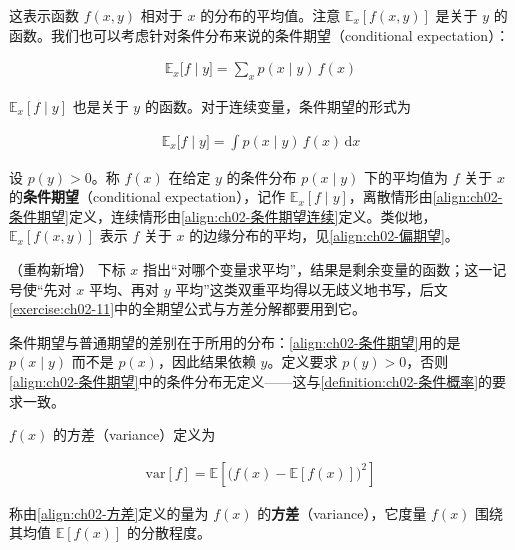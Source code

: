 \documentclass[../../main.tex]{subfiles}
\begin{document}
这表示函数 $f(x,y)$ 相对于 $x$ 的分布的平均值。注意 $\mathbb{E}_{x}[f(x,y)]$ 是关于 $y$ 的函数。我们也可以考虑针对条件分布来说的条件期望（conditional expectation）：

\begin{align}
  \mathbb{E}_{x}\big[f\mid y\big] = \sum_{x} p(x\mid y)\,f(x)
  \label{align:ch02-条件期望}
\end{align}

$\mathbb{E}_{x}[f\mid y]$ 也是关于 $y$ 的函数。对于连续变量，条件期望的形式为

\begin{align}
  \mathbb{E}_{x}\big[f\mid y\big] = \int p(x\mid y)\,f(x)\,\mathrm{d}x
  \label{align:ch02-条件期望连续}
\end{align}

\begin{definition}[条件期望]\label{definition:ch02-条件期望}
设 $p(y)>0$。称 $f(x)$ 在给定 $y$ 的条件分布 $p(x\mid y)$ 下的平均值为 $f$ 关于 $x$ 的\textbf{条件期望}（conditional expectation），记作 $\mathbb{E}_x[f\mid y]$，离散情形由\eqref{align:ch02-条件期望}定义，连续情形由\eqref{align:ch02-条件期望连续}定义。类似地，$\mathbb{E}_x[f(x,y)]$ 表示 $f$ 关于 $x$ 的边缘分布的平均，见\eqref{align:ch02-偏期望}。
\end{definition}

\begin{remark}（重构新增）
下标 $x$ 指出“对哪个变量求平均”，结果是剩余变量的函数；这一记号使“先对 $x$ 平均、再对 $y$ 平均”这类双重平均得以无歧义地书写，后文\cref{exercise:ch02-11}中的全期望公式与方差分解都要用到它。

条件期望与普通期望的差别在于所用的分布：\eqref{align:ch02-条件期望}用的是 $p(x\mid y)$ 而不是 $p(x)$，因此结果依赖 $y$。定义要求 $p(y)>0$，否则\eqref{align:ch02-条件期望}中的条件分布无定义——这与\cref{definition:ch02-条件概率}的要求一致。
\end{remark}

$f(x)$ 的方差（variance）定义为

\begin{align}
  \mathrm{var}[f] = \mathbb{E}\left[\big(f(x)-\mathbb{E}[f(x)]\big)^{2}\right]
  \label{align:ch02-方差}
\end{align}

\begin{definition}[方差]\label{definition:ch02-方差}
称由\eqref{align:ch02-方差}定义的量为 $f(x)$ 的\textbf{方差}（variance），它度量 $f(x)$ 围绕其均值 $\mathbb{E}[f(x)]$ 的分散程度。
\end{definition}
\end{document}
